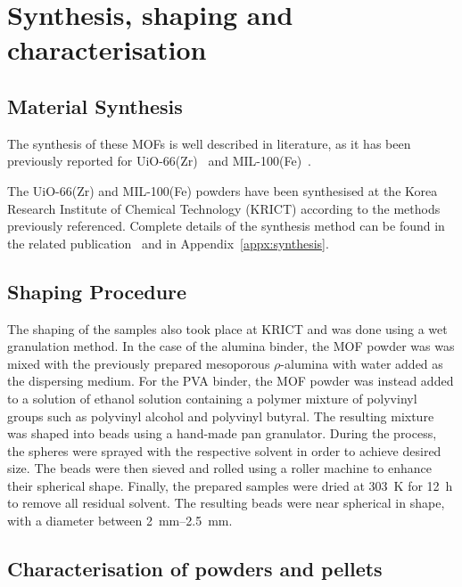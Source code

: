 
\section{Synthesis, shaping and characterisation}

\subsection{Material Synthesis}

The synthesis of these MOFs is well described in literature, 
as it has been previously reported for 
UiO-66(Zr)~\cite{cavkaNewZirconiumInorganic2008} and
MIL-100(Fe)~\cite{YangWaterStableMetalOrganic2013}.

The UiO-66(Zr) and MIL-100(Fe) powders have been synthesised at the
Korea Research Institute of Chemical Technology (KRICT) according 
to the methods previously referenced. Complete details of the 
synthesis method can be found in the related 
publication~\cite{valekarShapingPorousMetal2017}
and in Appendix~\ref{appx:synthesis}.

\subsection{Shaping Procedure}

The shaping of the samples also took place at KRICT and was done
using a wet granulation method. In the case of the alumina binder,
the MOF powder was was mixed with the previously prepared mesoporous
\(\rho\)-alumina with water added as the dispersing medium. For the 
PVA binder, the MOF powder was instead added to a solution of 
ethanol solution containing a polymer mixture of polyvinyl groups
such as polyvinyl alcohol and polyvinyl butyral. The resulting 
mixture was shaped into beads using a hand-made pan granulator.
During the process, the spheres were sprayed with the respective 
solvent in order to achieve desired size. The beads were then sieved
and rolled using a roller machine to enhance their spherical
shape. Finally, the prepared samples were dried at \SI{303}{\kelvin}
for \SI{12}{\hour} to remove all residual solvent.
The resulting beads were near spherical in shape, with a diameter
between \SIrange{2}{2.5}{\milli\metre}.

\subsection{Characterisation of powders and pellets}

